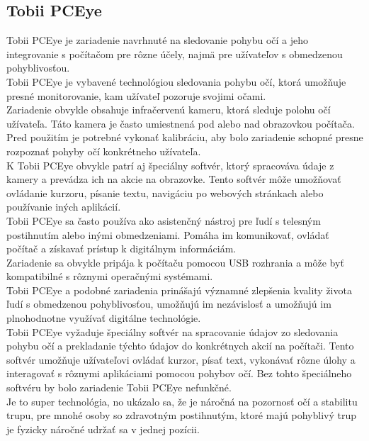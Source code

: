 \subsection{Tobii PCEye}
\tab[5 mm] Tobii PCEye je zariadenie navrhnuté na sledovanie pohybu očí a jeho integrovanie s počítačom pre rôzne účely, najmä pre užívateľov s obmedzenou pohyblivosťou. \\
\tab[5 mm] Tobii PCEye je vybavené technológiou sledovania pohybu očí, ktorá umožňuje presné monitorovanie, kam užívateľ pozoruje svojimi očami.\\
\tab[5 mm] Zariadenie obvykle obsahuje infračervenú kameru, ktorá sleduje polohu očí užívateľa. Táto kamera je často umiestnená pod alebo nad obrazovkou počítača.\\
\tab[5 mm] Pred použitím je potrebné vykonať kalibráciu, aby bolo zariadenie schopné presne rozpoznať pohyby očí konkrétneho užívateľa.\\
\tab[5 mm] K Tobii PCEye obvykle patrí aj špeciálny softvér, ktorý spracováva údaje z kamery a prevádza ich na akcie na obrazovke. Tento softvér môže umožňovať ovládanie kurzoru, písanie textu, navigáciu po webových stránkach alebo používanie iných aplikácií.\\
\tab[5 mm] Tobii PCEye sa často používa ako asistenčný nástroj pre ľudí s telesným postihnutím alebo inými obmedzeniami. Pomáha im komunikovať, ovládať počítač a získavať prístup k digitálnym informáciám.\\
\tab[5 mm] Zariadenie sa obvykle pripája k počítaču pomocou USB rozhrania a môže byť kompatibilné s rôznymi operačnými systémami.\\
\tab[5 mm] Tobii PCEye a podobné zariadenia prinášajú významné zlepšenia kvality života ľudí s obmedzenou pohyblivosťou, umožňujú im nezávislosť a umožňujú im plnohodnotne využívať digitálne technológie.\\
\tab[5 mm] Tobii PCEye vyžaduje špeciálny softvér na spracovanie údajov zo sledovania pohybu očí a prekladanie týchto údajov do konkrétnych akcií na počítači. Tento softvér umožňuje užívateľovi ovládať kurzor, písať text, vykonávať rôzne úlohy a interagovať s rôznymi aplikáciami pomocou pohybov očí. Bez tohto špeciálneho softvéru by bolo zariadenie Tobii PCEye nefunkčné.\\
\tab[5 mm] Je to super technológia, no ukázalo sa, že je náročná na pozornosť očí a stabilitu trupu, pre mnohé osoby so zdravotným postihnutým, ktoré majú pohyblivý trup je fyzicky náročné udržať sa v jednej pozícii.
